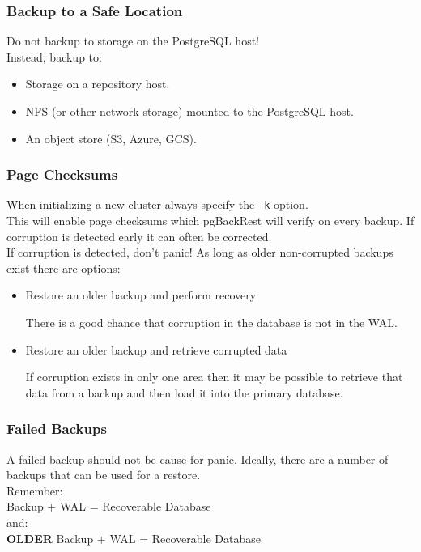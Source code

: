 \begin{frame}
    \frametitle{Backup to a Safe Location}

    Do not backup to storage on the PostgreSQL host!
    \\\vspace{1em}
    Instead, backup to:
    \begin{itemize}
        \item Storage on a repository host.
        \item NFS (or other network storage) mounted to the PostgreSQL host.
        \item An object store (S3, Azure, GCS).
    \end{itemize}
\end{frame}

\begin{frame}
    \frametitle{Page Checksums}

    When initializing a new cluster always specify the \texttt{-k} option.
    \\\vspace{1em}
    This will enable page checksums which pgBackRest will verify on every backup. If corruption is detected early it can often be corrected.
    \\\vspace{1em}
    If corruption is detected, don't panic! As long as older non-corrupted backups exist there are options:

    \begin{itemize}
        \item Restore an older backup and perform recovery

        There is a good chance that corruption in the database is not in the WAL.

        \item Restore an older backup and retrieve corrupted data

        If corruption exists in only one area then it may be possible to retrieve that data from a backup and then load it into the primary database.
    \end{itemize}
\end{frame}

\begin{frame}
    \frametitle{Failed Backups}

    A failed backup should not be cause for panic. Ideally, there are a number of backups that can be used for a restore.
    \\\vspace{1em}
    Remember:
    \\\vspace{1em}
    Backup + WAL = Recoverable Database
    \\\vspace{1em}
    and:
    \\\vspace{1em}
    \textbf{OLDER} Backup + WAL = Recoverable Database
\end{frame}

